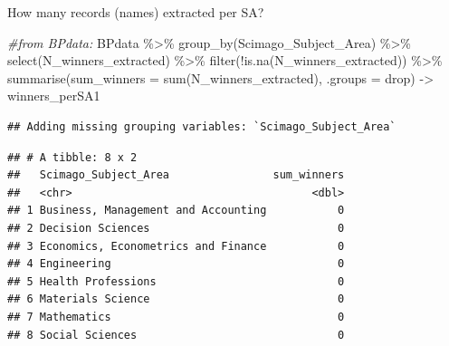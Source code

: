 \documentclass[
]{article}
\newenvironment{Shaded}{\begin{snugshade}}{\end{snugshade}}
\newcommand{\AttributeTok}[1]{\textcolor[rgb]{0.77,0.63,0.00}{#1}}
\newcommand{\CommentTok}[1]{\textcolor[rgb]{0.56,0.35,0.01}{\textit{#1}}}
\newcommand{\DecValTok}[1]{\textcolor[rgb]{0.00,0.00,0.81}{#1}}
\newcommand{\FunctionTok}[1]{\textcolor[rgb]{0.00,0.00,0.00}{#1}}
\newcommand{\NormalTok}[1]{#1}
\newcommand{\OtherTok}[1]{\textcolor[rgb]{0.56,0.35,0.01}{#1}}
\newcommand{\SpecialCharTok}[1]{\textcolor[rgb]{0.00,0.00,0.00}{#1}}
\newcommand{\StringTok}[1]{\textcolor[rgb]{0.31,0.60,0.02}{#1}}
\begin{document}
How many records (names) extracted per SA?

\begin{Shaded}
\begin{Highlighting}[]
\CommentTok{\#from BPdata:}
\NormalTok{BPdata }\SpecialCharTok{\%\textgreater{}\%} 
  \FunctionTok{group\_by}\NormalTok{(Scimago\_Subject\_Area) }\SpecialCharTok{\%\textgreater{}\%} 
  \FunctionTok{select}\NormalTok{(N\_winners\_extracted) }\SpecialCharTok{\%\textgreater{}\%} 
  \FunctionTok{filter}\NormalTok{(}\SpecialCharTok{!}\FunctionTok{is.na}\NormalTok{(N\_winners\_extracted)) }\SpecialCharTok{\%\textgreater{}\%} 
  \FunctionTok{summarise}\NormalTok{(}\AttributeTok{sum\_winners =} \FunctionTok{sum}\NormalTok{(N\_winners\_extracted), }\AttributeTok{.groups =} \StringTok{\textquotesingle{}drop\textquotesingle{}}\NormalTok{) }\OtherTok{{-}\textgreater{}}\NormalTok{ winners\_perSA1}
\end{Highlighting}
\end{Shaded}

\begin{verbatim}
## Adding missing grouping variables: `Scimago_Subject_Area`
\end{verbatim}

\begin{Shaded}
\end{Shaded}

\begin{verbatim}
## # A tibble: 8 x 2
##   Scimago_Subject_Area                sum_winners
##   <chr>                                     <dbl>
## 1 Business, Management and Accounting           0
## 2 Decision Sciences                             0
## 3 Economics, Econometrics and Finance           0
## 4 Engineering                                   0
## 5 Health Professions                            0
## 6 Materials Science                             0
## 7 Mathematics                                   0
## 8 Social Sciences                               0
\end{verbatim}

\begin{Shaded}
\end{Shaded}
\end{document}
